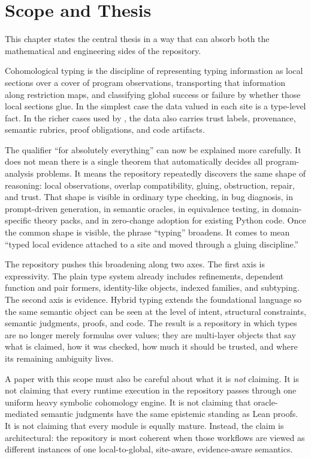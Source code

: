 \chapter{Scope and Thesis}

This chapter states the central thesis in a way that can absorb both the mathematical and
engineering sides of the repository.

\begin{definition}
Cohomological typing is the discipline of representing typing information as local
sections over a cover of program observations, transporting that information along
restriction maps, and classifying global success or failure by whether those local
sections glue. In the simplest case the data valued in each site is a type-level fact. In
the richer cases used by \DepPy{}, the data also carries trust labels, provenance,
semantic rubrics, proof obligations, and code artifacts.
\end{definition}

The qualifier ``for absolutely everything'' can now be explained more carefully. It does
not mean there is a single theorem that automatically decides all program-analysis
problems. It means the repository repeatedly discovers the same shape of reasoning:
local observations, overlap compatibility, gluing, obstruction, repair, and trust. That
shape is visible in ordinary type checking, in bug diagnosis, in prompt-driven generation,
in semantic oracles, in equivalence testing, in domain-specific theory packs, and in
zero-change adoption for existing Python code. Once the common shape is visible, the
phrase ``typing'' broadens. It comes to mean ``typed local evidence attached to a site and
moved through a gluing discipline.''

The repository pushes this broadening along two axes. The first axis is expressivity. The
plain type system already includes refinements, dependent function and pair formers,
identity-like objects, indexed families, and subtyping. The second axis is evidence.
Hybrid typing extends the foundational language so the same semantic object can be seen at
the level of intent, structural constraints, semantic judgments, proofs, and code. The
result is a repository in which types are no longer merely formulas over values; they are
multi-layer objects that say what is claimed, how it was checked, how much it should be
trusted, and where its remaining ambiguity lives.

A paper with this scope must also be careful about what it is \emph{not} claiming. It is
not claiming that every runtime execution in the repository passes through one uniform
heavy symbolic cohomology engine. It is not claiming that oracle-mediated semantic
judgments have the same epistemic standing as Lean proofs. It is not claiming that every
module is equally mature. Instead, the claim is architectural: the repository is most
coherent when those workflows are viewed as different instances of one local-to-global,
site-aware, evidence-aware semantics.

